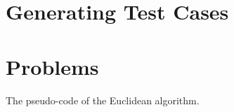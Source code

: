 \section{Generating Test Cases}

\section{Problems}

\begin{algorithm}
\DontPrintSemicolon
{}


\caption{The pseudo-code of the Euclidean algorithm.}
\label{euclidean-algo}
\end{algorithm}

